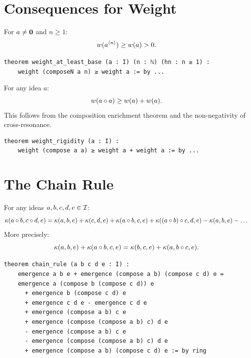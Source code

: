 \section{Consequences for Weight}

\begin{theorem}
\label{thm:weight-at-least-base}
For $a \neq \mathbf{0}$ and $n \geq 1$:
\[
  w(a^{\langle n \rangle}) \geq w(a) > 0.
\]
\end{theorem}

\begin{lstlisting}[caption={Weight bounds (IDT\_v3\_Emergence.lean)}]
theorem weight_at_least_base (a : I) (n : ℕ) (hn : n ≥ 1) :
    weight (composeN a n) ≥ weight a := by ...
\end{lstlisting}

\begin{theorem}
\label{thm:weight-rigidity}
For any idea $a$:
\[
  w(a \circ a) \geq w(a) + w(a).
\]
This follows from the composition enrichment theorem and the non-negativity of
cross-resonance.
\end{theorem}

\begin{lstlisting}[caption={Weight rigidity (IDT\_v3\_Emergence.lean)}]
theorem weight_rigidity (a : I) :
    weight (compose a a) ≥ weight a + weight a := by ...
\end{lstlisting}


\section{The Chain Rule}

\begin{theorem}
\label{thm:chain-rule}
For any ideas $a, b, c, d, e \in \mathcal{I}$:
\[
  \kappa(a \circ b, c \circ d, e) = \kappa(a, b, e) + \kappa(c, d, e)
  + \kappa(a \circ b, c, e) + \kappa((a \circ b) \circ c, d, e)
  - \kappa(a, b, e) - \dots
\]
More precisely:
\[
  \kappa(a, b, e) + \kappa(a \circ b, c, e) = \kappa(b, c, e) + \kappa(a, b \circ c, e).
\]
\end{theorem}

\begin{lstlisting}[caption={Chain rule (IDT\_v3\_Emergence.lean)}]
theorem chain_rule (a b c d e : I) :
    emergence a b e + emergence (compose a b) (compose c d) e =
    emergence a (compose b (compose c d)) e
      + emergence b (compose c d) e
      + emergence c d e - emergence c d e
      + emergence (compose a b) c e
      + emergence (compose (compose a b) c) d e
      - emergence (compose a b) c e
      - emergence (compose (compose a b) c) d e
      + emergence (compose a b) (compose c d) e := by ring
\end{lstlisting}


